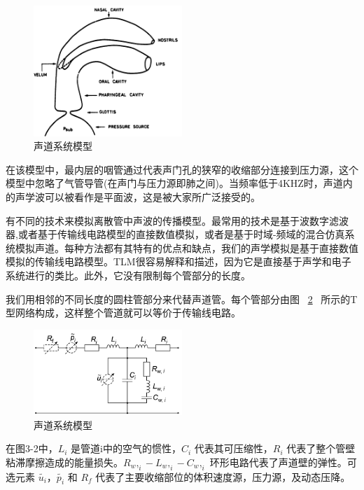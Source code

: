 \begin{figure}[htbp]
\centering
\includegraphics[width=0.5\textwidth]{figures/Tract.png}
\caption{声道系统模型}\label{fig:Tract}
\end{figure}

在该模型中，最内层的咽管通过代表声门孔的狭窄的收缩部分连接到压力源，这个模型中忽略了气管导管(在声门与压力源即肺之间)。当频率低于4KHZ时，声道内的声学波可以被看作是平面波，这是被大家所广泛接受的。


有不同的技术来模拟离散管中声波的传播模型。最常用的技术是基于波数字滤波器,或者基于传输线电路模型的直接数值模拟，或者是基于时域-频域的混合仿真系统模拟声道。每种方法都有其特有的优点和缺点，我们的声学模拟是基于直接数值模拟的传输线电路模型。TLM很容易解释和描述，因为它是直接基于声学和电子系统进行的类比。此外，它没有限制每个管部分的长度。


我们用相邻的不同长度的圆柱管部分来代替声道管。每个管部分由图 ~\ref{fig:Ttype}~  所示的T型网络构成，这样整个管道就可以等价于传输线电路。

\begin{figure}[htbp]
\centering
\includegraphics[width=0.5\textwidth]{figures/Ttype.png}
\caption{声道系统模型}\label{fig:Ttype}
\end{figure}

在图3-2中，$L_i$ 是管道i中的空气的惯性，$C_i$ 代表其可压缩性，$R_i$ 代表了整个管壁粘滞摩擦造成的能量损失。$ R_w,_i-L_w,_i-C_w,_i $ 环形电路代表了声道壁的弹性。可选元素 $\tilde{u_i}$，$\tilde{p_i}$ 和 $R_f$ 代表了主要收缩部位的体积速度源，压力源，及动态压降。



